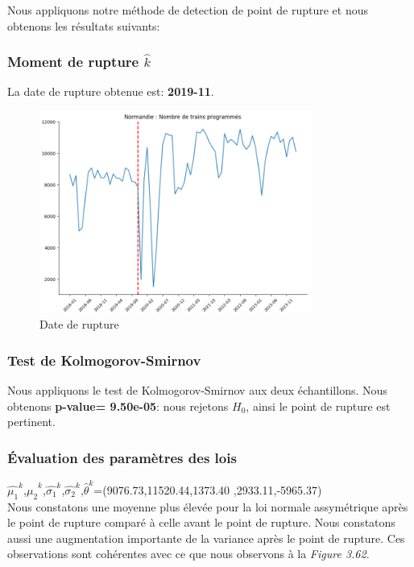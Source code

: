 {Nous appliquons notre méthode de detection de point de rupture et nous obtenons les résultats suivants:


\subsubsection{Moment de rupture $\hat{k}$}

La date de rupture obtenue est: \textbf{2019-11}. 

\begin{figure}[H]
  \centering
  \includegraphics[width=0.8\textwidth]{Nor_TP_3.png}
  \caption{Date de rupture}
\end{figure}

\subsubsection{Test de Kolmogorov-Smirnov}

Nous appliquons le test de Kolmogorov-Smirnov aux deux échantillons. Nous obtenons \textbf{p-value= 9.50e-05}: nous rejetons $H_0$, ainsi le point de rupture est pertinent.

\subsubsection{Évaluation des paramètres des lois}

$\hat{\mu_1}^k$,$\hat{\mu_2}^k$,$\hat{\sigma_1}^k$,$\hat{\sigma_2}^k$,$\hat{\theta}^k$=(9076.73,11520.44,1373.40 ,2933.11,-5965.37)\\

Nous constatons une moyenne plus élevée pour la loi normale assymétrique après le point de rupture comparé à celle avant le point de rupture. Nous constatons aussi une augmentation importante de la variance après le point de rupture. Ces observations sont cohérentes avec ce que nous observons à la \textit{Figure 3.62}.\\

}
